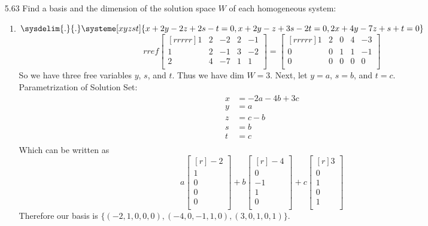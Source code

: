\documentclass[12pt]{article}
\begin{document}
\begin{enumerate}
\pagebreak
\item[5.63] Find a basis and the dimension of the solution space $W$ of each homogeneous system:
	\begin{enumerate}
	\item $\sysdelim{.}{.}\systeme[xyzst]{x+2y-2z+2s-t=0,x+2y-z+3s-2t=0,2x+4y-7z+s+t=0}$
		\[ rref\begin{bmatrix}[rrrrr]1&2&-2&2&-1\\1&2&-1&3&-2\\2&4&-7&1&1\\\end{bmatrix}=\begin{bmatrix}[rrrrr]1&2&0&4&-3\\0&0&1&1&-1\\0&0&0&0&0\\\end{bmatrix} \]
		So we have three free variables $y$, $s$, and $t$. Thus we have dim $W=3$. Next, let $y=a$, $s=b$, and $t=c$.\\
		Parametrization of Solution Set:
		\begin{align*}
		x&=-2a-4b+3c\\
		y&=a\\
		z&=c-b\\
		s&=b\\
		t&=c\\
		\end{align*}
		Which can be written as
		\[ a\begin{bmatrix}[r]-2\\1\\0\\0\\0\\\end{bmatrix} +b\begin{bmatrix}[r]-4\\0\\-1\\1\\0\\\end{bmatrix}+c\begin{bmatrix}[r]3\\0\\1\\0\\1\\\end{bmatrix} \]
		Therefore our basis is $\{(-2,1,0,0,0),(-4,0,-1,1,0),(3,0,1,0,1)\}$.
	\end{enumerate}
	

\end{enumerate}
\end{document}

